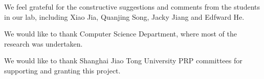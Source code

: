 We feel grateful for the constructive suggestions and comments from the students in our lab, including Xiao Jia, Quanjing Song, Jacky Jiang and Edfward He.

We would like to thank Computer Science Department, where most of the research was undertaken.

We would like to thank Shanghai Jiao Tong University PRP committees for supporting and granting this project.
